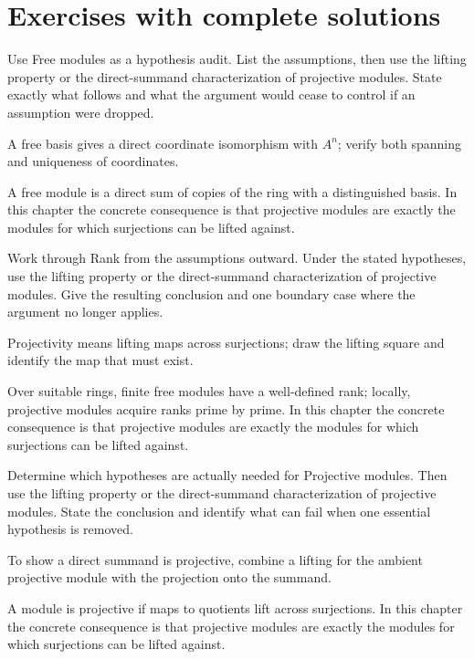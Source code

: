 \section{Exercises with complete solutions}

\begin{exercise}\label{exr:v13-01}
Use Free modules as a hypothesis audit. List the assumptions, then use the lifting property or the direct-summand characterization of projective modules. State exactly what follows and what the argument would cease to control if an assumption were dropped.
\end{exercise}
\begin{hint}
A free basis gives a direct coordinate isomorphism with \(A^n\); verify both spanning and uniqueness of coordinates.
\end{hint}
\begin{solution}
A free module is a direct sum of copies of the ring with a distinguished basis. In this chapter the concrete consequence is that projective modules are exactly the modules for which surjections can be lifted against.
\end{solution}

\begin{exercise}\label{exr:v13-02}
Work through Rank from the assumptions outward. Under the stated hypotheses, use the lifting property or the direct-summand characterization of projective modules. Give the resulting conclusion and one boundary case where the argument no longer applies.
\end{exercise}
\begin{hint}
Projectivity means lifting maps across surjections; draw the lifting square and identify the map that must exist.
\end{hint}
\begin{solution}
Over suitable rings, finite free modules have a well-defined rank; locally, projective modules acquire ranks prime by prime. In this chapter the concrete consequence is that projective modules are exactly the modules for which surjections can be lifted against.
\end{solution}

\begin{exercise}\label{exr:v13-03}
Determine which hypotheses are actually needed for Projective modules. Then use the lifting property or the direct-summand characterization of projective modules. State the conclusion and identify what can fail when one essential hypothesis is removed.
\end{exercise}
\begin{hint}
To show a direct summand is projective, combine a lifting for the ambient projective module with the projection onto the summand.
\end{hint}
\begin{solution}
A module is projective if maps to quotients lift across surjections. In this chapter the concrete consequence is that projective modules are exactly the modules for which surjections can be lifted against.
\end{solution}

